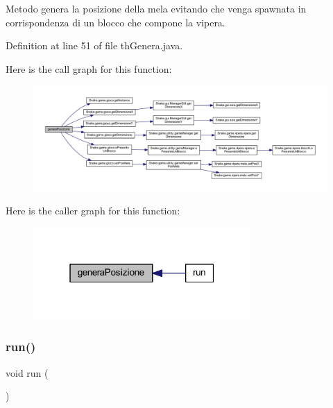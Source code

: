 Metodo genera la posizione della mela evitando che venga spawnata in corrispondenza di un blocco che compone la vipera. 



Definition at line 51 of file th\+Genera.\+java.

Here is the call graph for this function\+:
\nopagebreak
\begin{figure}[H]
\begin{center}
\leavevmode
\includegraphics[width=350pt]{class_snake_1_1game_1_1threads_1_1th_genera_a3d74cc6ca0a52476e34eefbf570fa492_cgraph}
\end{center}
\end{figure}
Here is the caller graph for this function\+:
\nopagebreak
\begin{figure}[H]
\begin{center}
\leavevmode
\includegraphics[width=235pt]{class_snake_1_1game_1_1threads_1_1th_genera_a3d74cc6ca0a52476e34eefbf570fa492_icgraph}
\end{center}
\end{figure}
\mbox{\label{class_snake_1_1game_1_1threads_1_1th_genera_a13a43e6d814de94978c515cb084873b1}} 
\subsubsection{\texorpdfstring{run()}{run()}}
{\footnotesize\ttfamily void run (\begin{DoxyParamCaption}{ }\end{DoxyParamCaption})}



